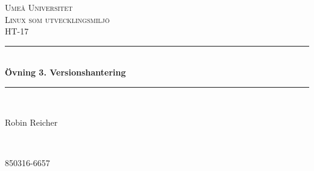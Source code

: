 \documentclass[11pt]{article}
\begin{document}

\begin{titlepage} %
	\newcommand{\HRule}{\rule{\linewidth}{0.5mm}} %

	\center %


	\textsc{\LARGE Umeå Universitet}\\[1.5cm] %

	\textsc{\Large Linux som utvecklingsmiljö}\\[0.5cm] %

	\textsc{\large HT-17}\\[0.5cm] %


	\HRule\\[0.4cm]

	{\huge\bfseries Övning 3. Versionshantering}\\[0.4cm] %

	\HRule\\[1.5cm]


	\begin{minipage}{0.4\textwidth}
		\begin{flushleft}
			\large
			Robin Reicher
		\end{flushleft}
	\end{minipage}
	~
	\begin{minipage}{0.4\textwidth}
		\begin{flushright}
			\large
			850316-6657
		\end{flushright}
	\end{minipage}



\end{titlepage}
\end{document}
